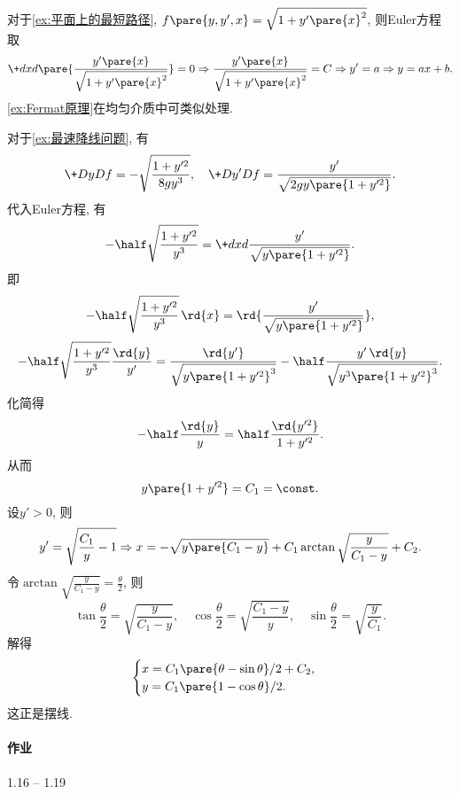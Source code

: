 \documentclass{ctexart}
\begin{document}
\begin{sample}
    \begin{ex}
        对于\cref{ex:平面上的最短路径}, $f\pare{y,y',x} = \sqrt{1+y'\pare{x}^2}$, 则Euler方程取
        \[ \+d{x}d{} \pare{\frac{y'\pare{x}}{\sqrt{1+y'\pare{x}^2}}} = 0 \Rightarrow \frac{y'\pare{x}}{\sqrt{1+y'\pare{x}^2}} = C \Rightarrow y' = a \Rightarrow y = ax+b. \]
        \cref{ex:Fermat原理}在均匀介质中可类似处理.
    \end{ex}
\end{sample}
\begin{sample}
    \begin{ex}
        对于\cref{ex:最速降线问题}, 有
        \[ \+DyDf = -\sqrt{\frac{1+y'^2}{8gy^3}},\quad \+D{y'}D{f} = \frac{y'}{\sqrt{2gy\pare{1+y'^2}}}. \]
        代入Euler方程, 有
        \[ -\half \sqrt{\frac{1+y'^2}{y^3}} = \+dxd{} \frac{y'}{\sqrt{y\pare{1+y'^2}}}. \]
        即
        \[ -\half \sqrt{\frac{1+y'^2}{y^3}}\,\rd{x} = \rd{\frac{y'}{\sqrt{y\pare{1+y'^2}}}}, \]
        \[ -\half \sqrt{\frac{1+y'^2}{y^3}}\frac{\rd{y}}{y'} = \frac{\rd{y'}}{\sqrt{y\pare{1+y'^2}^3}} - \half \frac{y'\,\rd{y}}{\sqrt{y^3\pare{1+y'^2}^3}}. \]
        化简得
        \[ -\half \frac{\rd{y}}{y} = \half \frac{\rd{y'^2}}{1+y'^2}. \]
        从而
        \[ y\pare{1+y'^2} = C_1 = \const. \]
        设$y'>0$, 则
        \[ y' = \sqrt{\frac{C_1}{y} - 1}\Rightarrow x = -\sqrt{y\pare{C_1 - y}} + C_1 \arctan \sqrt{\frac{y}{C_1 - y}} + C_2. \]
        令$\displaystyle \arctan \sqrt{\frac{y}{C_1 - y}} = \frac{\theta}{2}$, 则
        \[ \tan \frac{\theta}{2} = \sqrt{\frac{y}{C_1 - y}},\quad  \cos \frac{\theta}{2} = \sqrt{\frac{C_1 - y}{y}},\quad \sin \frac{\theta}{2} = \sqrt{\frac{y}{C_1}}. \]
        解得
        \[ \begin{cases}
            x = C_1 \pare{\theta - \sin \theta}/2 + C_2,\\
            y = C_1\pare{1-\cos\theta}/2.
        \end{cases} \]
        这正是摆线.
    \end{ex}
\end{sample}


\paragraph{作业} %
\label{par:作业}

1.16 -- 1.19


\end{document}
